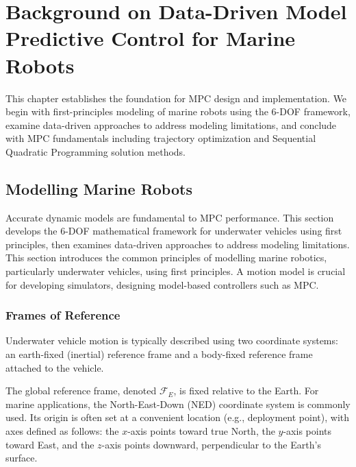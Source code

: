 




\chapter{Background on Data-Driven Model Predictive Control for Marine Robots}
\label{ch:background}

This chapter establishes the foundation for MPC design and implementation. We begin with first-principles modeling of marine robots using the 6-DOF framework, examine data-driven approaches to address modeling limitations, and conclude with MPC fundamentals including trajectory optimization and Sequential Quadratic Programming solution methods.

\section{Modelling Marine Robots}
\label{sec:modelling}
Accurate dynamic models are fundamental to MPC performance. This section develops the 6-DOF mathematical framework for underwater vehicles using first principles, then examines data-driven approaches to address modeling limitations.
This section introduces the common principles of modelling marine robotics, particularly underwater vehicles, using first principles. A motion model is crucial for developing simulators, designing model-based controllers such as MPC.

\subsection{Frames of Reference}
Underwater vehicle motion is typically described using two coordinate systems: an earth-fixed (inertial) reference frame and a body-fixed reference frame attached to the vehicle.

The global reference frame, denoted $\mathcal{F}_E$, is fixed relative to the Earth. For marine applications, the North-East-Down (NED) coordinate system is commonly used. Its origin is often set at a convenient location (e.g., deployment point), with axes defined as follows: the $x$-axis points toward true North, the $y$-axis points toward East, and the $z$-axis points downward, perpendicular to the Earth's surface.

